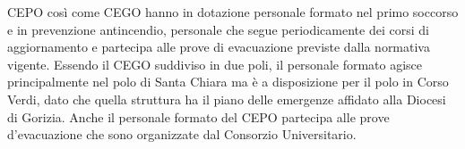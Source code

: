                 CEPO così come CEGO hanno in dotazione personale formato nel primo soccorso e in prevenzione antincendio, personale che segue periodicamente dei corsi di aggiornamento e partecipa alle prove di evacuazione previste dalla normativa vigente. Essendo il CEGO suddiviso in due poli, il personale formato agisce principalmente nel polo di Santa Chiara ma è a disposizione per il polo in Corso Verdi, dato che quella struttura ha il piano delle emergenze affidato alla Diocesi di Gorizia. Anche il personale formato del CEPO partecipa alle prove d'evacuazione che sono organizzate dal Consorzio Universitario. 